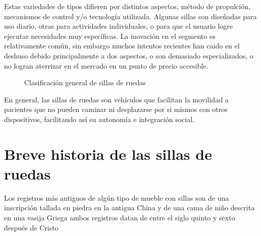Estas variedades de tipos difieren por distintos aspectos, m\'etodo de
propulci\'on, mecanismos de control y/o tecnolog\'ia utilizada. Algunas sillas
son dise\~nadas para uso diario, otras para actividades individuales, o para que
el usuario logre ejecutar necesidades muy espec\'ificas. La inovaci\'on en el
segmento es relativamente com\'un, sin embargo muchos intentos recientes han
caido en el deshuso debido principalmente a dos aspectos, o son demasiado
especializados, o no logran aterrizar en el mercado en un punto de precio
accesible.
\begin{figure}
    \centering
    \caption{Clasificaci\'on general de sillas de ruedas}
\end{figure}

En general, las sillas de ruedas son veh\'iculos que facilitan la movilidad a
pacientes que no pueden caminar ni desplazarse por si mismos con otros
dispositivos, facilitando así su autonom\'ia e integraci\'on social.
\parencite{definicion}

\section{Breve historia de las sillas de ruedas}

Los registros m\'as antiguos de alg\'un tipo de mueble con sillas son de una
inscripci\'on tallada en piedra en la antigua China y de una cama de ni\~no
descrita en una vasija Griega ambos registros datan de entre el siglo quinto y
sexto despu\'es de Cristo \parencite{history}


